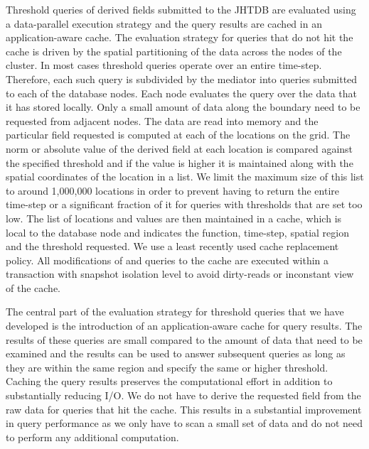 \documentclass{sig-alternate}
\newcommand{\kk}[1]{{\color{blue}{\it KK: #1}}}
\begin{document}
Threshold queries of derived fields submitted to the JHTDB are evaluated using a data-parallel execution strategy and the query results are 
cached in an application-aware
cache. The evaluation strategy for queries that do not hit the cache is driven by the spatial partitioning of the data across the nodes of the cluster.
In most cases threshold queries operate over an entire time-step. Therefore, each such query is subdivided by the mediator into queries submitted to
each of the database nodes. Each node evaluates the query over the data that it has stored locally. Only a small amount of data along the boundary
need to be requested from adjacent nodes. The data are read into memory and the particular field requested is computed at each of the locations on
the grid. The norm or absolute value of the derived field at each location is compared against the specified threshold and if the value is higher it is 
maintained along with
the spatial coordinates of the location in a list. We limit the maximum size of this list to around 1,000,000 locations in order to prevent having to return
the entire time-step or a significant fraction of it for queries with thresholds that are set too low. The list of locations and values are then maintained in a 
cache, which is local to the database node and indicates the function, time-step, spatial region and the threshold requested. We use a least recently
used cache replacement policy. All modifications of and queries to the cache are executed within a transaction with snapshot isolation level to
avoid dirty-reads or inconstant view of the cache.

The central part of the evaluation strategy for threshold queries that we have developed is the introduction of an application-aware cache
for query results. The results of these queries are small compared to the amount of data that need to be examined and the results can be used to
answer subsequent queries as long as they are within the same region and specify the same or higher threshold. Caching the query results
preserves the computational effort in addition to substantially reducing I/O. We do not have to derive the requested field from the raw data for 
queries that hit the cache. This results in a substantial improvement in query performance as we only have to scan
a small set of data and do not need to perform any additional computation.
\kk{Cite results for top-$k$ queries in databases and distributed systems. Remark that non of these strategies operate on large array datasets 
and they do not operate on derived fields, where each value of the derived field depends on multiple values from the original field and requires a kernel
computation accessing multiple data points in a kernel around the target location.}
\end{document}

